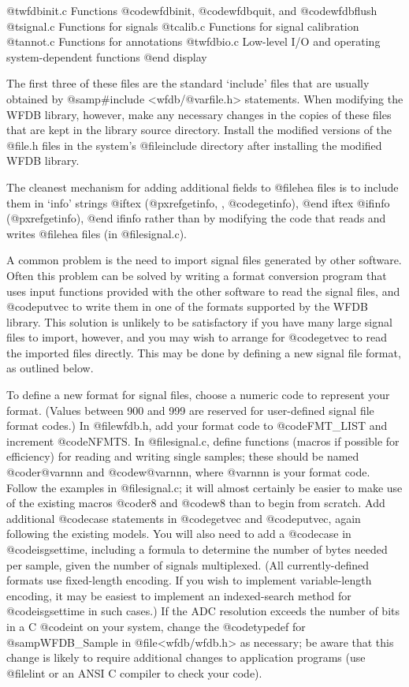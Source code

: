 {{{{{{{{{@t{wfdbinit.c    } Functions @code{wfdbinit}, @code{wfdbquit}, and @code{wfdbflush}
@t{signal.c      } Functions for signals
@t{calib.c       } Functions for signal calibration
@t{annot.c       } Functions for annotations
@t{wfdbio.c      } Low-level I/O and operating system-dependent functions
@end display

The first three of these files are the standard `include' files that
are usually obtained by @samp{#include <wfdb/@var{file}.h>} statements.
When modifying the WFDB library, however, make any necessary changes in
the copies of these files that are kept in the library source
directory.  Install the modified versions of the @file{.h} files in the
system's @file{include} directory after installing the modified WFDB
library.

The cleanest mechanism for adding additional fields to @file{hea} files is
to include them in `info' strings
@iftex
(@pxref{getinfo, , @code{getinfo}}),
@end iftex
@ifinfo
(@pxref{getinfo}),
@end ifinfo
rather than by modifying the code that reads and writes @file{hea}
files (in @file{signal.c}).

A common problem is the need to import signal files generated by other
software.  Often this problem can be solved by writing a format
conversion program that uses input functions provided with the other
software to read the signal files, and @code{putvec} to write them
in one of the formats supported by the WFDB library.  This solution is
unlikely to be satisfactory if you have many large signal files to
import, however, and you may wish to arrange for @code{getvec} to read
the imported files directly.  This may be done by defining a new signal
file format, as outlined below.

To define a new format for signal files, choose a numeric code to
represent your format.  (Values between 900 and 999 are reserved for
user-defined signal file format codes.)  In @file{wfdb.h}, add your format
code to @code{FMT_LIST} and increment @code{NFMTS}.  In @file{signal.c},
define functions (macros if possible for efficiency) for reading and
writing single samples; these should be named @code{r@var{nnn}} and
@code{w@var{nnn}}, where @var{nnn} is your format code.  Follow the
examples in @file{signal.c}; it will almost certainly be easier to make
use of the existing macros @code{r8} and @code{w8} than to begin from
scratch.  Add additional @code{case} statements in @code{getvec} and
@code{putvec}, again following the existing models.  You will also need
to add a @code{case} in @code{isgsettime}, including a formula to
determine the number of bytes needed per sample, given the number of
signals multiplexed.  (All currently-defined formats use fixed-length
encoding.  If you wish to implement variable-length encoding, it may be
easiest to implement an indexed-search method for @code{isgsettime} in
such cases.)  If the ADC resolution exceeds the number of bits in a C
@code{int} on your system, change the @code{typedef} for @samp{WFDB_Sample}
in @file{<wfdb/wfdb.h>} as necessary;  be aware that this change is likely
to require additional changes to application programs (use @file{lint}
or an ANSI C compiler to check your code).

}}}}}}}}}
